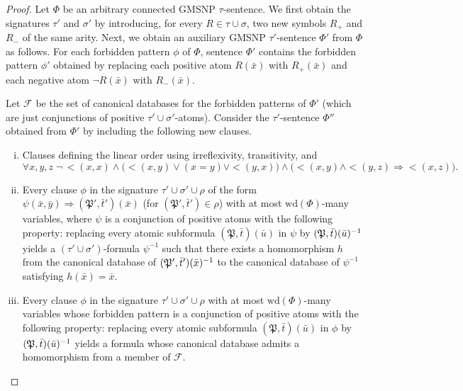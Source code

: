 \documentclass[oneside,reqno,12pt]{amsart}
\theoremstyle{plain}
\theoremstyle{remark}
\newcommand{\struct}[1]{\mathfrak{#1}}
\newcommand{\wh}{\ensuremath{\mathrm{wd}}\xspace}
\newcommand{\pre}[1]{#1\smash{^{-1}}}
\begin{document}
{\SNPAPRP* 

\begin{proof}
Let $\Phi$ be an arbitrary connected GMSNP $\tau$-sentence.
We first obtain the signatures $\tau'$ and $\sigma'$ by introducing, for every $R\in \tau\cup \sigma$, two new symbols $R_+$ and $R_-$ of the same arity. 
Next, we obtain an auxiliary GMSNP $\tau'$-sentence $\Phi'$ from $\Phi$ as follows.
For each forbidden pattern $\phi$ of $\Phi$, sentence $\Phi'$ contains the forbidden pattern $\phi'$ obtained by replacing each positive atom $R(\bar{x})$ with $R_+(\bar{x})$ and each negative atom $\neg R(\bar{x})$ with $R_-(\bar{x})$. 

Let $\mathcal{F}$ be the set of canonical databases for the forbidden patterns of $\Phi'$ (which are just conjunctions of positive $\tau'\cup \sigma'$-atoms). 
Consider the $\tau'$-sentence $\Phi''$ obtained from $\Phi'$ by including the following new clauses. 
\begin{enumerate}[i.]
\item \label{apitem:clauses1} Clauses defining the linear order using irreflexivity, transitivity, and
    \[
    \forall x,y,z\;   \neg\, {<}(x,x) \wedge    \big( {<}(x,y) \vee (x=y) \vee  {<}(y,x) \big) \wedge  \big( {<}(x,y) \wedge {<}(y,z) \Rightarrow  {<}(x,z) \big).
    \]
    \item \label{apitem:clauses2} Every clause $\phi$ in the signature $\tau'\cup \sigma' \cup \rho$ of the form $\psi(\bar{x},\bar{y})\Rightarrow (\struct{P}',\bar{t}')(\bar{x})$ (for $(\struct{P}',\bar{t}')\in \rho$) with at most $\wh(\Phi)$-many variables, where $\psi$ is a conjunction of positive atoms with the following property: 
replacing every atomic subformula $(\struct P ,\bar t)(\bar{u})$ in $\psi$ by $\pre{(\struct P ,\bar t)(\bar{u})}$ yields a $(\tau'\cup \sigma')$-formula $\psi^{-1}$ such that there exists a homomorphism $h$ from the canonical database of $\pre{(\struct{P}',\bar{t}')(\bar{x})}$ to the canonical database of $\psi^{-1}$ satisfying $h(\bar{x})=\bar{x}$.
    \item \label{apitem:clauses3} Every clause $\phi$ in the signature $\tau'\cup \sigma' \cup \rho$ with at most $\wh(\Phi)$-many variables whose forbidden pattern is a conjunction of positive atoms with the following property: 
replacing every atomic subformula $(\struct P ,\bar t)(\bar{u})$ in $\phi$ by $\pre{(\struct P ,\bar t)(\bar{u})}$ yields a formula whose canonical database admits a homomorphism from a member of $\mathcal{F}$.
    \end{enumerate}


\end{proof}}
\end{document}
